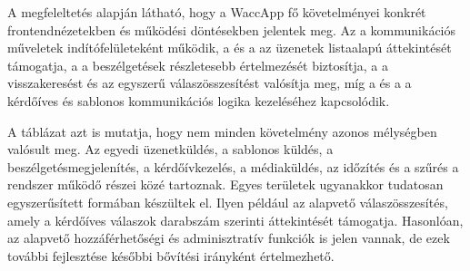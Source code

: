 A megfeleltetés alapján látható, hogy a WaccApp fő követelményei konkrét frontendnézetekben és működési döntésekben jelentek meg. Az  a kommunikációs műveletek indítófelületeként működik, a  és a  az üzenetek listaalapú áttekintését támogatja, a  a beszélgetések részletesebb értelmezését biztosítja, a  a visszakeresést és az egyszerű válaszösszesítést valósítja meg, míg a  és a  a kérdőíves és sablonos kommunikációs logika kezeléséhez kapcsolódik.

A táblázat azt is mutatja, hogy nem minden követelmény azonos mélységben valósult meg. Az egyedi üzenetküldés, a sablonos küldés, a beszélgetésmegjelenítés, a kérdőívkezelés, a médiaküldés, az időzítés és a szűrés a rendszer működő részei közé tartoznak. Egyes területek ugyanakkor tudatosan egyszerűsített formában készültek el. Ilyen például az alapvető válaszösszesítés, amely a kérdőíves válaszok darabszám szerinti áttekintését támogatja. Hasonlóan, az alapvető hozzáférhetőségi és adminisztratív funkciók is jelen vannak, de ezek további fejlesztése későbbi bővítési irányként értelmezhető.
